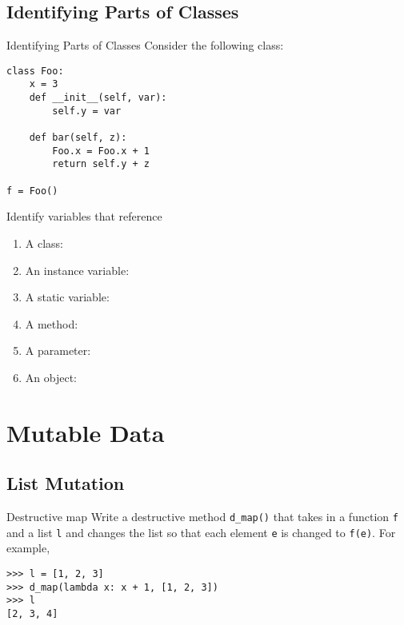 \documentclass[9pt]{beamer}
\begin{document}
\subsection{Identifying Parts of Classes}
\begin{frame}[fragile]{Identifying Parts of Classes}
  Consider the following class:

  \begin{lstlisting}
class Foo:
    x = 3
    def __init__(self, var):
        self.y = var

    def bar(self, z):
        Foo.x = Foo.x + 1
        return self.y + z

f = Foo()
  \end{lstlisting}

  Identify variables that reference
  \begin{enumerate}
    \item
      A class: 
    \item
      An instance variable: 
    \item
      A static variable: 
    \item
      A method: 
    \item
      A parameter: 
    \item
      An object: 
  \end{enumerate}

\end{frame}

\section{Mutable Data}
\subsection{List Mutation}

\begin{frame}[fragile]{Destructive map}
  Write a destructive method {\tt d\_map()} that takes in a function {\tt f}
  and a list {\tt l} and changes the list so that each element {\tt e} is
  changed to {\tt f(e)}. For example,

  \begin{lstlisting}
>>> l = [1, 2, 3]
>>> d_map(lambda x: x + 1, [1, 2, 3])
>>> l
[2, 3, 4]
  \end{lstlisting}
\end{frame}
\end{document}
